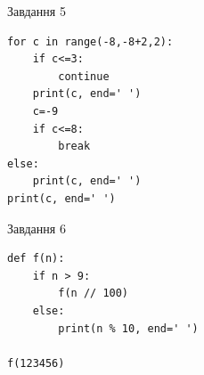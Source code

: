\documentclass[12pt, ukrainian]{article}
\begin{document}
{\vspace{15mm}
\begin{minipage}[t]{9.7cm}                
{\begin{center}Завдання {5}\end{center}}
\begin{verbatim}
for c in range(-8,-8+2,2):
    if c<=3:
        continue
    print(c, end=' ')
    c=-9
    if c<=8:
        break
else:
    print(c, end=' ')
print(c, end=' ')
\end{verbatim}     
\end{minipage}
\vline \hspace{8mm}
\begin{minipage}[t]{8.0cm}                
{\begin{center}Завдання {6}\end{center}}
\begin{verbatim}
def f(n):
    if n > 9:
        f(n // 100)
    else:
        print(n % 10, end=' ')

f(123456)
\end{verbatim}     
\end{minipage}

}
\newpage
\end{document}
